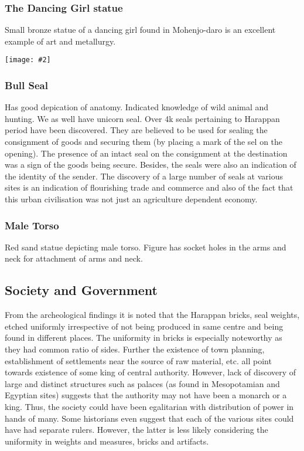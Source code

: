 \documentclass[8pt, a4paper, oneside, twocolumn]{extarticle}
\newcommand{\iph}[2]{
    \texttt{[image: \#2]}
}
\begin{document}
\subsubsection{The Dancing Girl statue}
Small bronze statue of a dancing girl found in Mohenjo-daro is an excellent example of art and metallurgy. 

\iph{0.2}{dancinggirl}

\subsubsection{Bull Seal}
Has good depication of anatomy. Indicated knowledge of wild animal and hunting. We as well have unicorn seal. Over 4k seals pertaining to Harappan period have been discovered. They are believed to be used for sealing the consignment of goods and securing them (by placing a mark of the sel on the opening). The presence of an intact seal on the consignment at the destination was a sign of the goods being secure. Besides, the seals were also an indication of the identity of the sender. The discovery of a large number of seals at various sites is an indication of flourishing trade and commerce and also of the fact that this urban civilisation was not just an agriculture dependent economy. 

\subsubsection{Male Torso}
Red sand statue depicting male torso. Figure has socket holes in the arms and neck for attachment of arms and neck.

\subsection{Society and Government}
From the archeological findings it is noted that the Harappan bricks, seal weights, etched uniformly irrespective of not being produced in same centre and being found in different places. The uniformity in bricks is especially noteworthy as they had common ratio of sides. Further the existence of town planning, establishment of settlements near the source of raw material, etc. all point towards existence of some king of central authority. However, lack of discovery of large and distinct structures such as palaces (as found in Mesopotamian and Egyptian sites) suggests that the authority may not have been a monarch or a king. Thus, the society could have been egalitarian with distribution of power in hands of many. Some historians even suggest that each of the various sites could have had separate rulers. However, the latter is less likely considering the uniformity in weights and measures, bricks and artifacts. 
\end{document}
